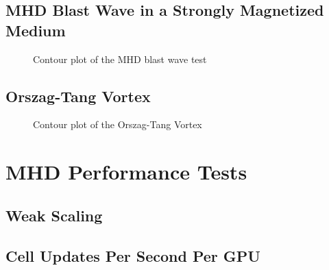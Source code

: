 



\subsection{MHD Blast Wave in a Strongly Magnetized Medium}
\label{sec:mhd-blast}

\begin{figure}[ht!]
    \caption{Contour plot of the MHD blast wave test }
    \label{fig:blast}
\end{figure}

\subsection{Orszag-Tang Vortex}
\label{sec:otv}

\begin{figure}[ht!]
    \caption{Contour plot of the Orszag-Tang Vortex }
    \label{fig:otv}
\end{figure}

\section{MHD Performance Tests}
\label{sec:mhd-perf-tests}


\subsection{Weak Scaling}

\subsection{Cell Updates Per Second Per GPU}

